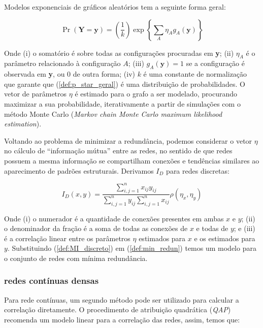\documentclass{article}
\begin{document}
Modelos exponenciais de gráficos aleatórios tem a seguinte forma geral:

\begin{equation}
\label{def:p_star_geral}
\Pr(\textbf{Y} = \textbf{y})
=\left(\frac{1}{k}\right)\exp\left\{\sum_A\eta_Ag_A(\textbf{y})\right\}
\end{equation}

Onde (i) o somatório é sobre todas as configurações procuradas em \textbf{y};
(ii) $\eta_A$ é o parâmetro relacionado à configuração $A$; (iii)
$g_A(\textbf{y})=1$ se a configuração é observada em \textbf{y}, ou 0 de outra
forma; (iv) $k$ é uma constante de normalização que garante que
(\ref{def:p_star_geral}) é uma distribuição de probabilidades. O vetor de
parâmetros $\eta$ é estimado para o grafo a ser modelado, procurando maximizar
a sua probabilidade, iterativamente a partir de simulações com o método Monte
Carlo (\textit{Markov chain Monte Carlo maximum likelihood estimation}).

Voltando ao problema de minimizar a redundância, podemos considerar o vetor
$\eta$ no cálculo de ``informação mútua'' entre as redes, no sentido de que
redes possuem a mesma informação se compartilham conexões e tendências similares
ao aparecimento de padrões estruturais. Derivamos $I_D$ para redes discretas:

\begin{equation}
\label{def:MI_discreto}
I_D(x, y) =\frac{\sum_{i,j = 1}^n x_{ij}y_{ij}}{\sum_{i,j = 1}^n
y_{ij}\sum_{i,j=1}^n x_{ij}} \rho(\eta_x, \eta_y)
\end{equation}

Onde (i) o numerador é a quantidade de conexões presentes em ambas $x$ e $y$;
(ii) o denominador da fração é a soma de todas as conexões de $x$ e todas de
$y$; e (iii) é a correlação linear entre os parâmetros $\eta$ estimados para $x$
e os estimados para $y$. Substituindo (\ref{def:MI_discreto}) em
(\ref{def:min_redun}) temos um modelo para o conjunto de redes com mínima
redundância.

\subsubsection{redes contínuas densas}

Para rede contínuas, um segundo método pode ser utilizado para calcular a
correlação diretamente. O procedimento de atribuição quadrática (\textit{QAP})
recomenda um modelo linear para a correlação das redes, assim, temos que:
\end{document}
